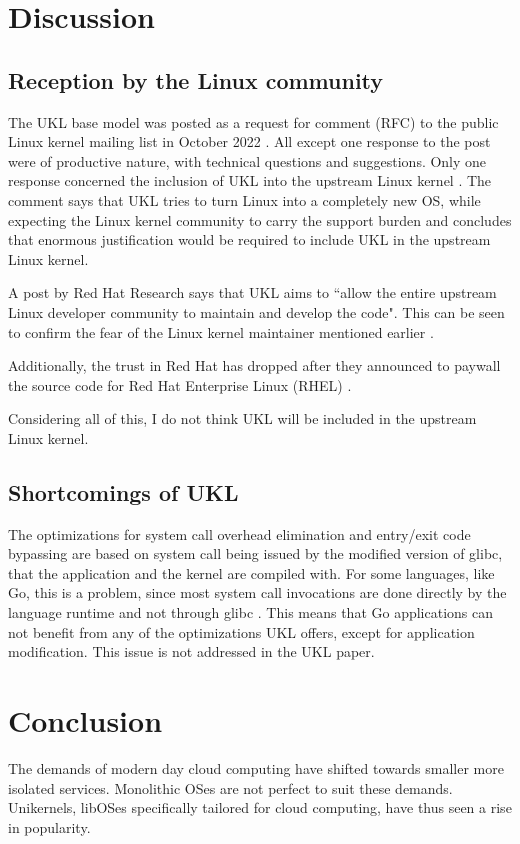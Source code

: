 \documentclass[10pt,twocolumn,a4paper]{article}
\begin{document}
\section{Discussion}\label{sec:discussion}
  \subsection{Reception by the Linux community}
    The UKL base model was posted as a request for comment (RFC) to the public Linux
    kernel mailing list in October 2022 \cite{ukl-rfc-lwn}.
    All except one response to the post were of productive nature, with technical questions
    and suggestions. 
    Only one response concerned the inclusion of UKL into the upstream Linux kernel 
    \cite{ukl-rfc-negative}.
    The comment says that UKL tries to turn Linux into a completely new OS, while expecting 
    the Linux kernel community to carry the support burden and concludes that enormous
    justification would be required to include UKL in the upstream Linux kernel.

    A post by Red Hat Research \cite{ukl-redhat-post} says that UKL aims to ``allow 
    the entire upstream Linux developer community to maintain and develop the code".
    This can be seen to confirm the fear of the Linux kernel maintainer mentioned earlier
    \cite{ukl-rfc-negative}.

    Additionally, the trust in Red Hat has dropped after they announced to paywall the
    source code for Red Hat Enterprise Linux (RHEL) \cite{redhat-fuckup}.

    Considering all of this, I do not think UKL will be included in the upstream
    Linux kernel.

  \subsection{Shortcomings of UKL}
    The optimizations for system call overhead elimination and entry/exit code bypassing
    are based on system call being issued by the modified version of glibc, that
    the application and the kernel are compiled with.
    For some languages, like Go, this is a problem, since most system call invocations
    are done directly by the language runtime and not through glibc \cite{ukl-vs-unicraft}.
    This means that Go applications can not benefit from any of the optimizations UKL offers,
    except for application modification.
    This issue is not addressed in the UKL paper.

\section{Conclusion}
  The demands of modern day cloud computing have shifted towards smaller more isolated services.
  Monolithic OSes are not perfect to suit these demands.
  Unikernels, libOSes specifically tailored for cloud computing, have thus seen a rise in popularity.
\end{document}
